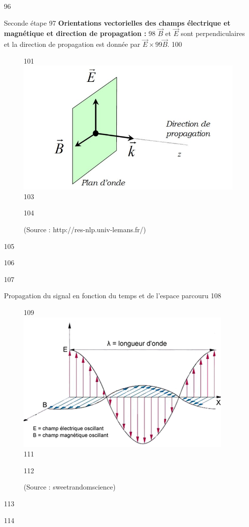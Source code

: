 \documentclass[pdf]{beamer}
\begin{document}
96 \begin{frame}{Seconde étape} 
97 	\textbf{Orientations vectorielles des champs électrique et magnétique et direction de propagation :} 
98 		$\vec{B}$ et $\vec{E}$ sont perpendiculaires et la direction de propagation est donnée par $\vec{E} \times 
99 		\vec{B}$. 
100 		\begin{figure}[ht!] 
101 			 			\includegraphics[scale=0.4]{direction-be.jpg} 
103 			\caption{(Source : http://res-nlp.univ-lemans.fr/)} 
104 		\end{figure} 
105 \end{frame} 
106 
 
107 \begin{frame}{Propagation du signal en fonction du temps et de l'espace parcouru} 
108 	\begin{figure}[ht!] 
109          \includegraphics[scale=0.7]{signal.png} 
111 		\caption{(Source : sweetrandomscience)} 
112 	\end{figure} 
113 \end{frame} 
114 
 
\end{document}
